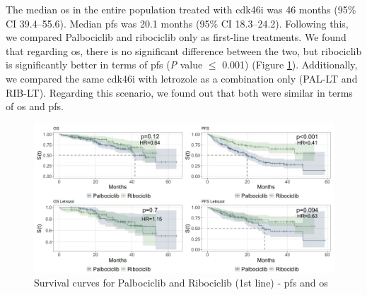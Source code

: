 The median \ac{os} in the entire population treated with \ac{cdk46i} was 46 months (95\% CI 39.4–55.6). Median \ac{pfs} was 20.1 months (95\% CI 18.3–24.2). Following this, we compared Palbociclib and ribociclib only as first-line treatments. We found that regarding \ac{os}, there is no significant difference between the two, but ribociclib is significantly better in terms of \ac{pfs} (\textit{P} value $\le$ 0.001) (Figure \ref{fig:interest}). Additionally, we compared the same \ac{cdk46i} with letrozole as a combination only (PAL-LT and RIB-LT). Regarding this scenario, we found out that both were similar in terms of \ac{os} and \ac{pfs}.


\begin{figure}[ht]
  \caption{Survival curves for Palbociclib and Ribociclib (1st line) - \ac{pfs} and \ac{os}}\label{fig:interest} 
  \includegraphics[scale=0.45]{figures/interest_curve_both.jpeg}%

\end{figure}


